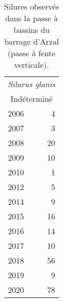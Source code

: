 \begin{table}[ht]
\centering
\begin{tabular}{lr}
  \toprule
  \multicolumn{2}{c}{\textit{Silurus glanis}}  \\ 
   \multicolumn{2}{c}{Indéterminé} \\
  \midrule
2006 & 4 \\ 
  2007 & 3 \\ 
  2008 & 20 \\ 
  2009 & 10 \\ 
  2010 & 1 \\ 
  2012 & 5 \\ 
  2014 & 9 \\ 
  2015 & 16 \\ 
  2016 & 14 \\ 
  2017 & 10 \\ 
  2018 & 56 \\ 
  2019 & 9 \\ 
  2020 & 78 \\ 
   \bottomrule
\end{tabular}
\caption{Silures observés dans la passe à bassins du barrage
				d'Arzal (passe à fente verticale).} 
\label{table_bilanannuel_sil}
\end{table}
